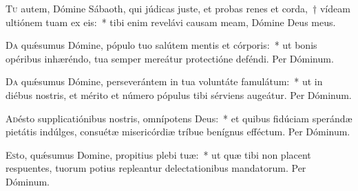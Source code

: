 \documentclass[vesperale_romanum.tex]{subfiles}
\begin{document}



\capitulum


\lettrine{T}{u} autem, Dómine Sábaoth, qui júdicas juste, et probas renes et corda,~† vídeam ultiónem tuam ex eis:~* tibi enim revelávi causam meam, Dómine Deus meus.


\oratio

\lettrine{D}{a} quǽsumus Dómine, pópulo tuo salútem mentis et córporis:~* ut bonis opéribus inhæréndo, tua semper mereátur protectióne deféndi.
Per Dóminum.




\oratio

\lettrine{D}{a} quǽsumus Dómine, perseverántem in tua voluntáte famulátum:~* ut in diébus nostris, et mérito et número pópulus tibi sérviens augeátur.
Per Dóminum.



\oratio

\lettrine{A}{d}ésto supplicatiónibus nostris, omnípotens Deus:~* et quibus fidúciam sperándæ pietátis indúlges, consuétæ misericórdiæ tríbue benígnus efféctum. Per Dóminum.



\oratio

\lettrine{E}{s}to, quǽsumus Domine, propitius plebi tuæ:~* ut quæ tibi non placent respuentes, tuorum potius repleantur delectationibus mandatorum. Per Dóminum.


\end{document}
